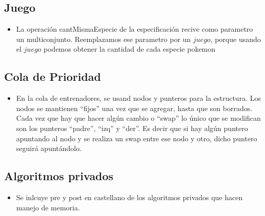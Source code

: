 
\subsection{Juego}

\begin{itemize}
\item{La operaci\'on cantMismaEspecie de la especificaci\'on recive como parametro un multiconjunto. 
Reemplazamos ese parametro por un $juego$, porque usando el $juego$ podemos obtener la cantidad de cada especie pokemon}

\end{itemize}

\subsection{Cola de Prioridad}

\begin{itemize}
\item{En la cola de entrenadores, se usand nodos y punteros para la estructura. Los nodos se mantienen ``fijos'' una vez que se agregar, hasta que son borrados. Cada vez que hay que hacer alg\'un cambio o ``swap'' lo \'unico que se modifican son los punteros ``padre'', ``izq'' y ``der''. Es decir que si hay alg\'un puntero apuntando al nodo y se realiza un swap entre ese nodo y otro, dicho puntero seguir\'a apunt\'andolo.}

\end{itemize}


\subsection{Algoritmos privados}

\begin{itemize}

\item{Se inlcuye pre y post en castellano de los algoritmos privados que hacen manejo de memoria.}

\end{itemize}

